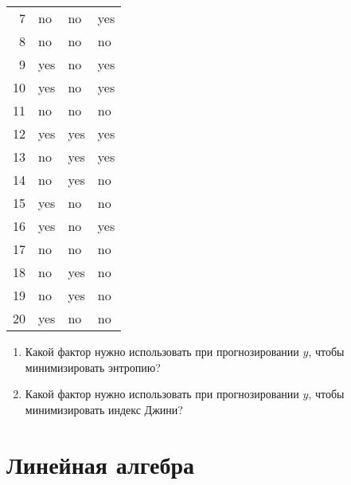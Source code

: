 \documentclass[pdftex,11pt,openany]{book}\usepackage[]{graphicx}\usepackage[]{color}
\begin{document}
\begin{problem}
\begin{table}[ht]
\begin{tabular}{rlll}
  7 & no & no & yes \\ 
  8 & no & no & no \\ 
  9 & yes & no & yes \\ 
  10 & yes & no & yes \\ 
  11 & no & no & no \\ 
  12 & yes & yes & yes \\ 
  13 & no & yes & yes \\ 
  14 & no & yes & no \\ 
  15 & yes & no & no \\ 
  16 & yes & no & yes \\ 
  17 & no & no & no \\ 
  18 & no & yes & no \\ 
  19 & no & yes & no \\ 
  20 & yes & no & no \\ 
   \hline
\end{tabular}
\end{table}



\begin{enumerate}
\item Какой фактор нужно использовать при прогнозировании $y$, чтобы минимизировать энтропию?
\item Какой фактор нужно использовать при прогнозировании $y$, чтобы минимизировать индекс Джини?
\end{enumerate}
\end{problem}

\begin{solution}
\end{solution}












\chapter{Линейная алгебра}
\end{document}

